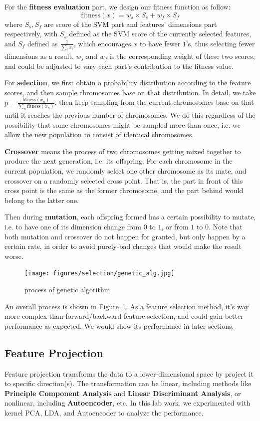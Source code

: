 \documentclass[journal]{IEEEtran}
\begin{document}
For the \textbf{fitness evaluation} part, we design our fitness function as follow:
$$
\mathrm{fitness}(x) = w_s\times S_s + w_f\times S_f
$$
where $S_s, S_f$ are score of the SVM part and features' dimensions part respectively, with $S_s$ defined as the SVM score of the currently selected features, and $S_f$ defined as $\frac{1}{\sum_i x_i}$, which encourages $x$ to have fewer $1$'s, thus selecting fewer dimensions as a result. $w_s$ and $w_f$ is the corresponding weight of these two scores, and could be adjusted to vary each part's contribution to the fitness value.

For \textbf{selection}, we first obtain a probability distribution according to the feature scores, and then sample chromosomes base on that distribution. In detail, we take $p = \frac{\mathrm{fitness}(x_n)}{\sum_n \mathrm{fitness}(x_n)}$, then keep sampling from the current chromosomes base on that until it reaches the previous number of chromosomes. We do this regardless of the possibility that some chromosomes might be sampled more than once, i.e. we allow the new population to consist of identical chromosomes.

\textbf{Crossover} means the process of two chromosomes getting mixed together to produce the next generation, i.e. its offspring. For each chromosome in the current population, we randomly select one other chromosome as its mate, and crossover on a randomly selected cross point. That is, the part in front of this cross point is the same as the former chromosome, and the part behind would belong to the latter one.

Then during \textbf{mutation}, each offspring formed has a certain possibility to mutate, i.e. to have one of its dimension change from $0$ to $1$, or from $1$ to $0$. Note that both mutation and crossover do not happen for granted, but only happen by a certain rate, in order to avoid purely-bad changes that would make the result worse.

\begin{figure}[htpb]
  \centering
  \texttt{[image: figures/selection/genetic\_alg.jpg]}
  \caption{process of genetic algorithm}
  \label{fig:1}
  \vspace{-3mm}
\end{figure}
An overall process is shown in Figure~\ref{fig:1}. As a feature selection method, it's way more complex than forward/backward feature selection, and could gain better performance as expected. We would show its performance in later sections.

\subsection{Feature Projection}
Feature projection transforms the data to a lower-dimensional space by project it to specific direction(s). The transformation can be linear, including methods like \textbf{Principle Component Analysis} and \textbf{Linear Discriminant Analysis}, or nonlinear, including \textbf{Autoencoder}, etc. In this lab work, we experimented with kernel PCA, LDA, and Autoencoder to analyze the performance.
~\\
\end{document}
